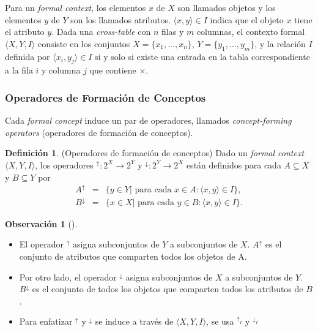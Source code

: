 \documentclass[12pt,oneside,letterpaper]{book}
\newcommand{\eng}[1]{\textit{#1}\xspace}			%
\theoremstyle{definition}
\newtheorem{definition}{Definición}[section]
\newtheorem{remark}{Observación}[section]
\begin{document}
Para un \eng{formal context}, los elementos $x$ de $X$ son llamados objetos y los elementos $y$ de $Y$ son los llamados atributos. $\langle x,y \rangle \in I$ indica que el objeto $x$ tiene el atributo $y$. Dada una \eng{cross-table} con $n$ filas y $m$ columnas, el contexto formal $\langle X,Y,I \rangle$ consiste en los conjuntos $X = \{x_1,\dots,x_n\}$, $Y = \{y_1,\dots,y_m\}$, y la relación $I$ definida por $\langle x_i,y_j \rangle \in I$ si y solo si existe una entrada en la tabla correspondiente a la fila $i$ y columna $j$ que contiene $\times$. 

\subsubsection{Operadores de Formación de Conceptos}
\label{ssub:operadores_de_formacion_de_conceptos}
Cada \eng{formal concept} induce un par de operadores, llamados \eng{concept-forming operators} (operadores de formación de conceptos). 

\begin{definition}{(Operadores de formación de conceptos)}
Dado un \eng{formal context} $\langle X,Y,I \rangle$, los operadores $^{\uparrow}: 2^X \rightarrow 2^Y$ y $^{\downarrow}: 2^Y \rightarrow 2^X$ están definidos para cada $A \subseteq X$ y $B \subseteq Y$ por
\begin{eqnarray}
	A^{\uparrow} 	&=& \{y \in Y|\text{ para cada } x \in A: \langle x,y \rangle \in I\}, \nonumber \\
	B^{\downarrow} 	&=& \{x \in X|\text{ para cada } y \in B: \langle x,y \rangle \in I\}. \nonumber
\end{eqnarray}
\end{definition}

\begin{remark}[]

$ $

\begin{itemize}
	\item El operador $^{\uparrow}$ asigna subconjuntos de $Y$ a subconjuntos de $X$. $A^{\uparrow}$ es el conjunto de atributos que comparten todos los objetos de A.
	\item Por otro lado, el operador $^{\downarrow}$ asigna subconjuntos de $X$ a subconjuntos de $Y$. $B^{\downarrow}$ es el conjunto de todos los objetos que comparten todos los atributos de $B$.
	\item Para enfatizar $^{\uparrow}$ y $^{\downarrow}$ se induce a través de $\langle X,Y,I \rangle$, se usa $^{\uparrow_I}$ y $^{\downarrow_I}$
\end{itemize}
\end{remark}
\end{document}
